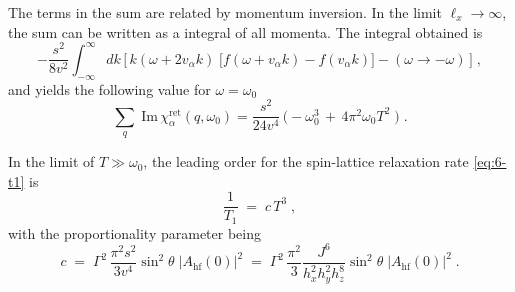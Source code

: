 \begin{comment}
    \begin{equation}
        \begin{split}
         \sum_{q} \;\mathrm{Im} \,  \chi_{\alpha}(q, \omega) \; & = \;  - \frac{\im \pi}{v^{2}} \, \frac{s^2}{4 \ell_x} \,  \sum_{ k}  \;   \Big\{  \;    \\ & + \;       k( \omega  + 2 v_{\alpha} k)  \;   \left( f( \omega + v_{ \alpha } k ) - f(  v_{ \alpha } k ) \right) \;
            \\   & -  \;   k( 2 v_{ \alpha } k  -  \omega ) \;   \left(  f(  - \omega + v_{ \alpha } k ) - f(  v_{ \alpha } k ) \right)    \Big\} 
        \end{split} 
    \end{equation}
\end{comment}

The terms in the sum are related by momentum inversion. %
In the limit $\ell_x \to \infty$, the sum can be written as a integral of all momenta. %
The integral obtained is 
\begin{equation}
    - \frac{  s^2}{8 v^2}  \int_{-\infty}^{\infty} dk \,    \Bigg[  \, k( \omega +2 v_{\alpha} k )  \;   \Big[ f( \omega + v_{ \alpha } k ) - f(  v_{ \alpha } k ) \Big] - ( \omega \to - \omega ) \, \Bigg] \; ,
\end{equation}
and yields the following value for $\omega = \omega_0$
\begin{equation}    
       \sum_{q} \;\mathrm{Im} \,  \chi_{\alpha}^{\text{ret}}(q, \omega_0)  =  \frac{  s^2}{24 v^4}\, \Big(  - \omega^3_0 \, + \, 4 \pi^2 \omega_0 T^2 \;  \Big) \; .
\end{equation}

In the limit of $T \gg \omega_0$, the leading order for the spin-lattice relaxation rate \eqref{eq:6-t1} is 
\begin{equation}
    \dfrac{1}{T_1} \; = \; c \, T^3 \; , \label{eq:6-t1-final}
\end{equation}
with the proportionality parameter being 
\begin{equation}
    c \; = \; \Gamma^2 \, \frac{  \pi^2 s^2}{3 v^4}  \sin^2 \theta\; \vert A_{\text{hf}}(0)\vert^2 \; = \;   \Gamma^2 \,  \frac{  \pi^2 }{3 }  \frac{J^6}{ h^2_x h^2_y h^8_z} \sin^2 \theta\; \vert A_{\text{hf}}(0)\vert^2 \; .
\end{equation}
    
